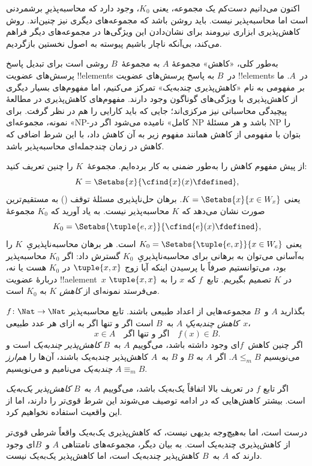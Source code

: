 \documentclass[../../../include/open-logic-section]{subfiles}
\begin{document}

\begin{explain}
اکنون می‌دانیم دست‌کم یک مجموعه، یعنی $K_0$، وجود دارد که
محاسبه‌پذیرِ برشمردنی است اما محاسبه‌پذیر نیست. باید روشن باشد که
مجموعه‌های دیگری نیز چنین‌اند. روش کاهش‌پذیری ابزاری نیرومند برای
نشان‌دادن این ویژگی‌ها در مجموعه‌های دیگر فراهم می‌کند، بی‌آنکه ناچار
باشیم پیوسته به اصول نخستین بازگردیم.

به‌طور کلی، «کاهش» مجموعهٔ $A$ به مجموعهٔ~$B$ روشی است برای تبدیل
پاسخ پرسش‌های عضویت !!{element}s در~$B$ به پاسخ پرسش‌های عضویت
!!{element}s در~$A$. ما بر مفهومی به نام «کاهش‌پذیری چندبه‌یک» تمرکز
می‌کنیم، اما مفهوم‌های بسیار دیگری از کاهش‌پذیری با ویژگی‌های گوناگون
وجود دارند. مفهوم‌های کاهش‌پذیری در مطالعهٔ پیچیدگی محاسباتی نیز
مرکزی‌اند؛ جایی که باید کارایی را هم در نظر گرفت. برای نمونه،
مجموعه‌ای «NP-کامل» نامیده می‌شود اگر در NP باشد و هر مسئلهٔ NP را
بتوان با مفهومی از کاهش همانند مفهوم زیر به آن کاهش داد، با این شرط
اضافی که کاهش در زمان چندجمله‌ای محاسبه‌پذیر باشد.

از پیش مفهوم کاهش را به‌طور ضمنی به کار برده‌ایم. مجموعهٔ~$K$ را
چنین تعریف کنید:
\[
K = \Setabs{x}{\cfind{x}(x) \fdefined},
\]
یعنی $K=\Setabs{x}{x\in W_x}$. برهان حل‌ناپذیری مسئلهٔ توقف
() به مستقیم‌ترین صورت نشان می‌دهد که
$K$ محاسبه‌پذیر نیست. به یاد آورید که $K_0$ مجموعهٔ
\[
K_0 = \Setabs{\tuple{e, x}}{\cfind{e}(x) \fdefined },
\]
یعنی $K_0=\Setabs{\tuple{e,x}}{x\in W_e}$ است. هر برهان
محاسبه‌ناپذیریِ~$K$ را به‌آسانی می‌توان به برهانی برای
محاسبه‌ناپذیریِ~$K_0$ گسترش داد: اگر $K_0$ محاسبه‌پذیر بود، می‌توانستیم
صرفاً با پرسیدن اینکه آیا زوج $\tuple{x,x}$ در $K_0$ هست یا نه،
دربارهٔ عضویت !!a{element}~$x$ در $K$ تصمیم بگیریم. تابع~$f$ که $x$
را به $\tuple{x,x}$ می‌فرستد نمونه‌ای از \emph{کاهش} $K$ به $K_0$
است.
\end{explain}

\begin{defn}
بگذارید $A$ و~$B$ مجموعه‌هایی از اعداد طبیعی باشند. تابع محاسبه‌پذیر
$f\colon\Nat\to\Nat$ \emph{کاهش چندبه‌یکِ} $A$ به~$B$ است اگر و تنها
اگر به ازای هر عدد طبیعی~$x$،
\[
x \in A \quad \text{اگر و تنها اگر} \quad f(x) \in B.
\]
اگر چنین کاهش~$f$ای وجود داشته باشد، می‌گوییم $A$ به~$B$
\emph{کاهش‌پذیر چندبه‌یک} است و می‌نویسیم $A\leq_m B$. اگر $A$ به
$B$ و $B$ به~$A$ کاهش‌پذیر چندبه‌یک باشند، آن‌ها را \emph{هم‌ارز
چندبه‌یک} می‌نامیم و می‌نویسیم $A\equiv_m B$.
\end{defn}

اگر تابع $f$ در تعریف بالا اتفاقاً یک‌به‌یک باشد، می‌گوییم $A$ به~$B$
\emph{کاهش‌پذیر یک‌به‌یک} است. بیشتر کاهش‌هایی که در ادامه توصیف
می‌شوند این شرط قوی‌تر را دارند، اما از این واقعیت استفاده نخواهیم کرد.

\begin{digress}
درست است، اما به‌هیچ‌وجه بدیهی نیست، که کاهش‌پذیری یک‌به‌یک واقعاً
شرطی قوی‌تر از کاهش‌پذیری چندبه‌یک است. به بیان دیگر، مجموعه‌های
نامتناهی $A$ و~$B$ای وجود دارند که $A$ به~$B$ کاهش‌پذیر چندبه‌یک
است، اما کاهش‌پذیر یک‌به‌یک نیست.
\end{digress}
\end{document}
